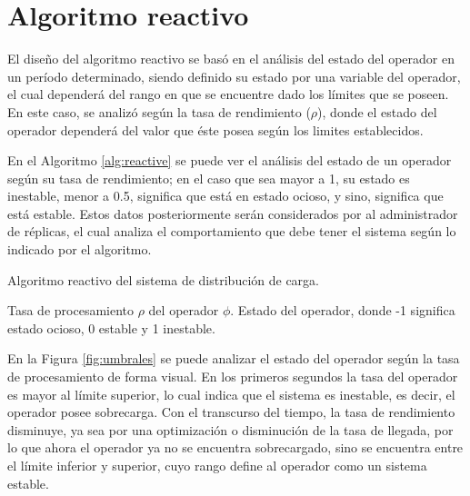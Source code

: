 \section{Algoritmo reactivo}
El diseño del algoritmo reactivo se basó en el análisis del estado del operador en un período determinado, siendo definido su estado por una variable del operador, el cual dependerá del rango en que se encuentre dado los límites que se poseen. En este caso, se analizó según la tasa de rendimiento ($\rho$), donde el estado del operador dependerá del valor que éste posea según los limites establecidos.

En el Algoritmo \ref{alg:reactive} se puede ver el análisis del estado de un operador según su tasa de rendimiento; en el caso que sea mayor a 1, su estado es inestable, menor a 0.5, significa que está en estado ocioso, y sino, significa que está estable. Estos datos posteriormente serán considerados por al administrador de réplicas, el cual analiza el comportamiento que debe tener el sistema según lo indicado por el algoritmo.

\begin{algorithm}[!ht]
	\caption{Algoritmo reactivo del sistema de distribución de carga.}
	\label{alg:reactive}
	\begin{algorithmic}[1]
	\REQUIRE Tasa de procesamiento $\rho$ del operador $\phi$.
	\ENSURE Estado del operador, donde -1 significa estado ocioso, 0 estable y 1 inestable.
	\ELSE
	\ENDIF
	\end{algorithmic}
\end{algorithm}

En la Figura \ref{fig:umbrales} se puede analizar el estado del operador según la tasa de procesamiento de forma visual. En los primeros segundos la tasa del operador es mayor al límite superior, lo cual indica que el sistema es inestable, es decir, el operador posee sobrecarga. Con el transcurso del tiempo, la tasa de rendimiento disminuye, ya sea por una optimización o disminución de la tasa de llegada, por lo que ahora el operador ya no se encuentra sobrecargado, sino se encuentra entre el límite inferior y superior, cuyo rango define al operador como un sistema estable.

